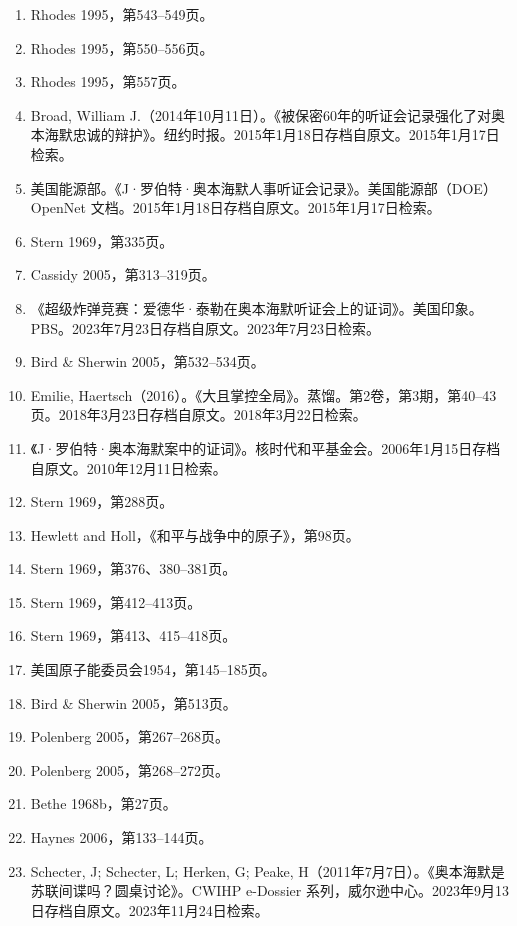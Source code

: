 \begin{enumerate}
\item Rhodes 1995，第543–549页。
\item Rhodes 1995，第550–556页。
\item Rhodes 1995，第557页。
\item Broad, William J.（2014年10月11日）。《被保密60年的听证会记录强化了对奥本海默忠诚的辩护》。纽约时报。2015年1月18日存档自原文。2015年1月17日检索。
\item 美国能源部。《J·罗伯特·奥本海默人事听证会记录》。美国能源部（DOE）OpenNet 文档。2015年1月18日存档自原文。2015年1月17日检索。
\item Stern 1969，第335页。
\item Cassidy 2005，第313–319页。
\item 《超级炸弹竞赛：爱德华·泰勒在奥本海默听证会上的证词》。美国印象。PBS。2023年7月23日存档自原文。2023年7月23日检索。
\item Bird & Sherwin 2005，第532–534页。
\item Emilie, Haertsch（2016）。《大且掌控全局》。蒸馏。第2卷，第3期，第40–43页。2018年3月23日存档自原文。2018年3月22日检索。
\item 《J·罗伯特·奥本海默案中的证词》。核时代和平基金会。2006年1月15日存档自原文。2010年12月11日检索。
\item Stern 1969，第288页。
\item Hewlett and Holl，《和平与战争中的原子》，第98页。
\item Stern 1969，第376、380–381页。
\item Stern 1969，第412–413页。
\item Stern 1969，第413、415–418页。
\item 美国原子能委员会1954，第145–185页。
\item Bird & Sherwin 2005，第513页。
\item Polenberg 2005，第267–268页。
\item Polenberg 2005，第268–272页。
\item Bethe 1968b，第27页。
\item Haynes 2006，第133–144页。
\item Schecter, J; Schecter, L; Herken, G; Peake, H（2011年7月7日）。《奥本海默是苏联间谍吗？圆桌讨论》。CWIHP e-Dossier 系列，威尔逊中心。2023年9月13日存档自原文。2023年11月24日检索。
\end{enumerate}
